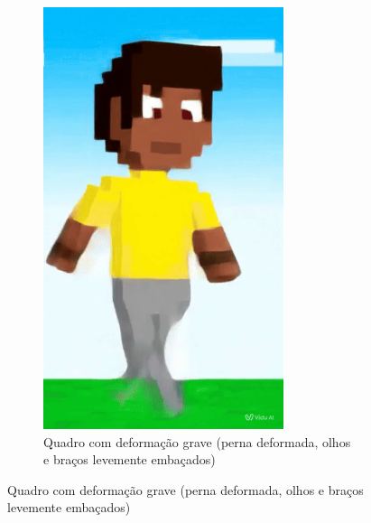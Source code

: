 \begin{figure}[htbp]
\begin{subfigure}{0.32\linewidth}
        \includegraphics[width=0.9\linewidth]{figs/vidu/2grave.png}
        \caption{\small Quadro com deformação grave (perna deformada, olhos e braços levemente embaçados)}
        \label{fig:viduDeformacao2Grave}
    \end{subfigure}
\end{figure}


